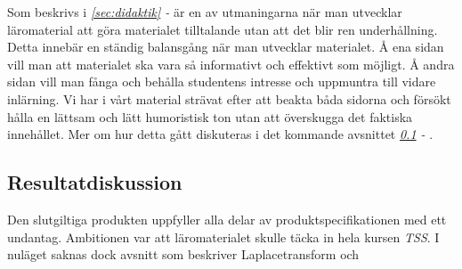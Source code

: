 \documentclass[12pt,a4paper,twoside,openright]{article}
\begin{document}
Som beskrivs i \textit{\ref{sec:didaktik} - } är
en av utmaningarna när man utvecklar läromaterial att göra materialet
tilltalande utan att det blir ren underhållning. Detta innebär en
ständig balansgång när man utvecklar materialet. Å ena sidan vill man
att materialet ska vara så informativt och effektivt som möjligt. Å
andra sidan vill man fånga och behålla studentens intresse och
uppmuntra till vidare inlärning. Vi har i vårt material strävat efter
att beakta båda sidorna och försökt hålla en lättsam och lätt
humoristisk ton utan att överskugga det faktiska innehållet. Mer om
hur detta gått diskuteras i det kommande avsnittet
\textit{\ref{sec:resDisk} - }.

\subsection{Resultatdiskussion}
\label{sec:resDisk}
Den slutgiltiga produkten uppfyller alla delar av
produktspecifikationen med ett undantag. Ambitionen var att
läromaterialet skulle täcka in hela kursen \textit{TSS}. I nuläget
saknas dock avsnitt som beskriver Laplacetransform och
\end{document}
